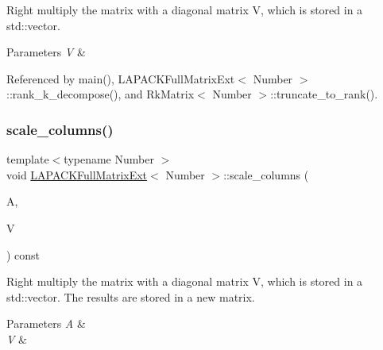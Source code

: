 Right multiply the matrix with a diagonal matrix {\ttfamily V}, which is stored in a std\+::vector. 
\begin{DoxyParams}{Parameters}
{\em V} & \\
\hline
\end{DoxyParams}


Referenced by main(), L\+A\+P\+A\+C\+K\+Full\+Matrix\+Ext$<$ Number $>$\+::rank\+\_\+k\+\_\+decompose(), and Rk\+Matrix$<$ Number $>$\+::truncate\+\_\+to\+\_\+rank().

\mbox{\label{classLAPACKFullMatrixExt_a2510d3bd30956bb2831b960796d3abca}} 
\subsubsection{\texorpdfstring{scale\+\_\+columns()}{scale\_columns()}\hspace{0.1cm}{\footnotesize\ttfamily [2/3]}}
{\footnotesize\ttfamily template$<$typename Number $>$ \\
void \hyperlink{classLAPACKFullMatrixExt}{L\+A\+P\+A\+C\+K\+Full\+Matrix\+Ext}$<$ Number $>$\+::scale\+\_\+columns (\begin{DoxyParamCaption}\item[{\hyperlink{classLAPACKFullMatrixExt}{L\+A\+P\+A\+C\+K\+Full\+Matrix\+Ext}$<$ Number $>$ \&}]{A,  }\item[{const std\+::vector$<$ typename numbers\+::\+Number\+Traits$<$ Number $>$\+::real\+\_\+type $>$ \&}]{V }\end{DoxyParamCaption}) const}

Right multiply the matrix with a diagonal matrix {\ttfamily V}, which is stored in a std\+::vector. The results are stored in a new matrix. 
\begin{DoxyParams}{Parameters}
{\em A} & \\
\hline
{\em V} & \\
\hline
\end{DoxyParams}
\mbox{\label{classLAPACKFullMatrixExt_ab6e19be9ab53b4a38ba0d47a3b5f3daa}} 
